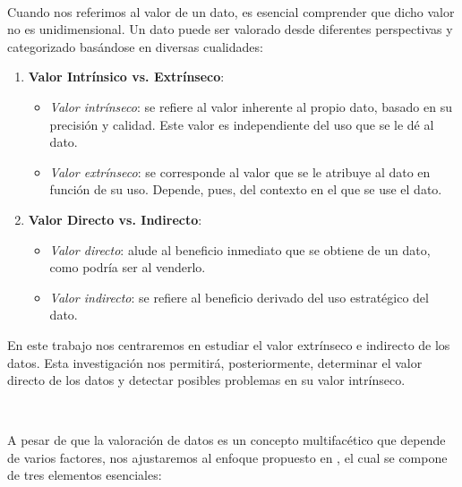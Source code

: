 \

Cuando nos referimos al valor de un dato, es esencial
comprender que dicho valor no es unidimensional. Un dato
puede ser valorado desde diferentes perspectivas y
categorizado basándose en diversas cualidades:

\begin{enumerate}
  \item \textbf{Valor Intrínsico vs. Extrínseco}:
  \begin{itemize}
    \item \emph{Valor intrínseco}: se refiere al valor
    inherente al propio dato, basado en su precisión y calidad.
    Este valor es independiente del uso que se le dé al dato.

    \item \emph{Valor extrínseco}: se corresponde al valor
    que se le atribuye al dato en función de su uso.
    Depende, pues, del contexto en el que se use el dato.
  \end{itemize}

  \item \textbf{Valor Directo vs. Indirecto}:
  \begin{itemize}
    \item \emph{Valor directo}: alude al beneficio
    inmediato que se obtiene de un dato, como podría ser
    al venderlo.

    \item \emph{Valor indirecto}: se refiere al
    beneficio derivado del uso estratégico del dato.
  \end{itemize}
\end{enumerate}

En este trabajo nos centraremos en estudiar el valor extrínseco
e indirecto de los datos. Esta investigación nos permitirá,
posteriormente, determinar el valor directo de los datos y
detectar posibles problemas en su valor intrínseco.

\

A pesar de que la valoración de datos es un concepto
multifacético que depende de varios factores, nos
ajustaremos al enfoque propuesto en \cite{dataShapley,betaShapley},
el cual se compone de tres elementos esenciales:

